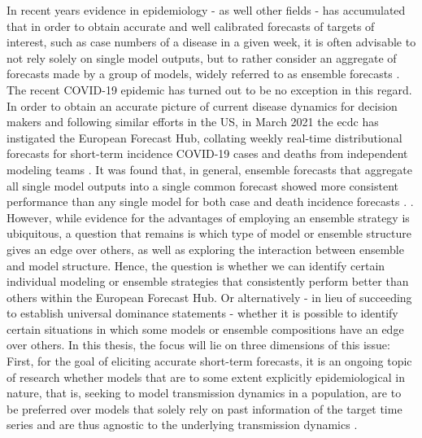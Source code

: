 In recent years evidence in epidemiology - as well other fields - has accumulated that in order to obtain accurate and well calibrated forecasts of targets of interest, such as case numbers of a disease in a given week, it is often advisable to not rely solely on single model outputs, but to rather consider an aggregate of forecasts made by a group of models, widely referred to as ensemble forecasts . \\
The recent COVID-19 epidemic has turned out to be no exception in this regard. In order to obtain an accurate picture of current disease dynamics for decision makers and following similar efforts in the US, in March 2021 the \ac{ecdc} has instigated the European Forecast Hub, collating weekly real-time distributional forecasts for short-term incidence COVID-19 cases and deaths from independent modeling teams \cite{european_covid-19_forecast_hub_european_2021}. It was found that, in general, ensemble forecasts that aggregate all single model outputs into a single common forecast showed more consistent performance than any single model for both case and death incidence forecasts \cite{sherratt_draft_nodate}. . \\
However, while evidence for the advantages of employing an ensemble strategy is ubiquitous, %
 a question that remains %
is which type of model or ensemble structure gives an edge over others, as well as exploring the interaction between ensemble and model structure. Hence, the question is whether we can identify certain individual modeling or ensemble strategies that consistently perform better than others within the European Forecast Hub. Or alternatively - in lieu of succeeding to establish universal dominance statements - whether it is possible to identify certain situations in which some models or ensemble compositions have an edge over others. %
In this thesis, the focus will lie on three dimensions of this issue:\\
First, for the goal of eliciting accurate short-term forecasts, %
it is an ongoing topic of research whether models that are to some extent explicitly epidemiological in nature, that is, seeking to model transmission dynamics in a population, are to be preferred over models that solely rely on past information of the target time series and are thus agnostic to the underlying transmission dynamics \citep{funk_short-term_nodate}.  %
